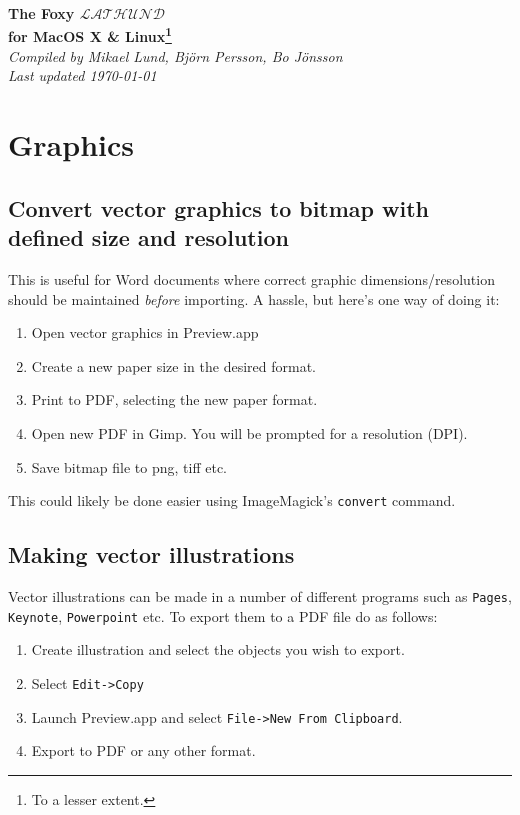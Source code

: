 \documentclass[a4paper,10pt]{article}
\begin{document}
\renewcommand{\thefootnote}{\fnsymbol{footnote}}%

\begin{center}
\Huge
\textbf{The Foxy $\mathcal{LATHUND}$\\ for MacOS X \& Linux\footnote[2]{To a lesser extent.}}\\
\normalsize
\vspace{0.5cm}
\emph{Compiled by Mikael Lund, Bj\"orn Persson, Bo J\"onsson\\
Last updated \today}
\end{center}

\tableofcontents



\section{Graphics}
\subsection{Convert vector graphics to bitmap with defined size and resolution}
This is useful for Word documents where correct graphic dimensions/resolution should be maintained \emph{before} importing. A hassle, but here's one way of doing it:
\begin{enumerate}
\item Open vector graphics in Preview.app
\item Create a new paper size in the desired format.
\item Print to PDF, selecting the new paper format.
\item Open new PDF in Gimp. You will be prompted for a resolution (DPI).
\item Save bitmap file to png, tiff etc.
\end{enumerate}
This could likely be done easier using ImageMagick's \verb"convert" command.

\subsection{Making vector illustrations}
Vector illustrations can be made in a number of different programs such as
\verb+Pages+, \verb+Keynote+, \verb+Powerpoint+ etc. To export them to a PDF file do as follows:
\begin{enumerate}
\item Create illustration and select the objects you wish to export.
\item Select \verb+Edit->Copy+
\item Launch Preview.app and select \verb+File->New From Clipboard+.
\item Export to PDF or any other format.
\end{enumerate}
\end{document}
